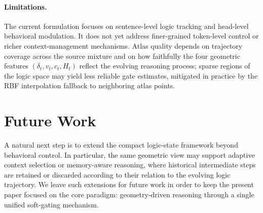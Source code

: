 \documentclass{article}
\begin{document}
\paragraph{Limitations.}
The current formulation focuses on sentence-level logic tracking and head-level behavioral modulation. It does not yet address finer-grained token-level control or richer context-management mechanisms. Atlas quality depends on trajectory coverage across the source mixture and on how faithfully the four geometric features $(\delta_t, v_t, c_t, H_t)$ reflect the evolving reasoning process; sparse regions of the logic space may yield less reliable gate estimates, mitigated in practice by the RBF interpolation fallback to neighboring atlas points.

\section{Future Work}
\label{sec:future}

A natural next step is to extend the compact logic-state framework beyond behavioral control. In particular, the same geometric view may support adaptive context selection or memory-aware reasoning, where historical intermediate steps are retained or discarded according to their relation to the evolving logic trajectory. We leave such extensions for future work in order to keep the present paper focused on the core paradigm: geometry-driven reasoning through a single unified soft-gating mechanism.




\end{document}
